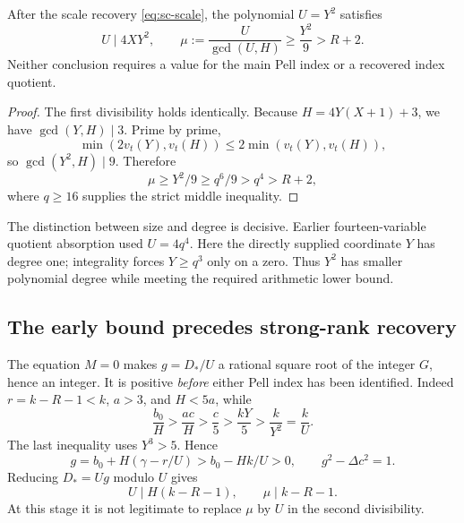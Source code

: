 \begin{lemma}\label{lem:sc-modulus}
After the scale recovery \eqref{eq:sc-scale}, the polynomial $U=Y^2$
satisfies
\[
 U\mid4XY^2,\qquad
 \mu:=\frac{U}{\gcd(U,H)}\ge\frac{Y^2}{9}>R+2.
\]
Neither conclusion requires a value for the main Pell index or a
recovered index quotient.
\end{lemma}
\begin{proof}
The first divisibility holds identically.  Because
$H=4Y(X+1)+3$, we have $\gcd(Y,H)\mid3$.  Prime by prime,
\[
 \min(2v_t(Y),v_t(H))\le2\min(v_t(Y),v_t(H)),
\]
so $\gcd(Y^2,H)\mid9$.  Therefore
\[
 \mu\ge Y^2/9\ge q^6/9>q^4>R+2,
\]
where $q\ge16$ supplies the strict middle inequality.
\end{proof}

The distinction between size and degree is decisive.  Earlier
fourteen-variable quotient absorption used $U=4q^4$.  Here the directly
supplied coordinate $Y$ has degree one; integrality forces $Y\ge q^3$
only on a zero.  Thus $Y^2$ has smaller polynomial degree while meeting
the required arithmetic lower bound.

\subsection{The early bound precedes strong-rank recovery}

The equation $M=0$ makes $g=D_*/U$ a rational square root of the integer
$G$, hence an integer.  It is positive \emph{before} either Pell index
has been identified.  Indeed $r=k-R-1<k$, $a>3$, and $H<5a$, while
\[
 \frac{b_0}{H}>\frac{ac}{H}>\frac c5>\frac{kY}{5}
       >\frac{k}{Y^2}=\frac kU.
\]
The last inequality uses $Y^3>5$.  Hence
\[
 g=b_0+H(\gamma-r/U)>b_0-Hk/U>0,
 \qquad g^2-\Delta c^2=1.
\]
Reducing $D_*=Ug$ modulo $U$ gives
\begin{equation}\label{eq:sc-weakdiv}
 U\mid H(k-R-1),\qquad \mu\mid k-R-1.
\end{equation}
At this stage it is not legitimate to replace $\mu$ by $U$ in the second
divisibility.

